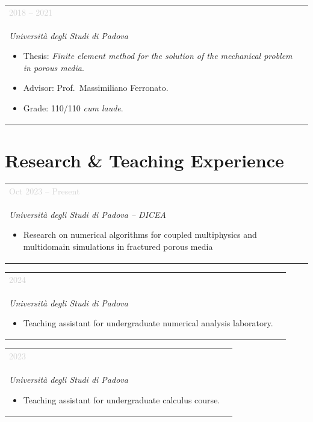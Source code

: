 \documentclass[10pt, a4paper]{article}
\makeatletter
\newcommand{\entry}[4]{%
  \begin{tabular}{@{}p{3.2cm} p{12.0cm}@{}}
    \raggedright\small\textcolor{lightgray}{#1} &
    \begin{minipage}[t]{12.0cm}
      \textbf{#2}\\
      \textit{#3}
      #4
    \end{minipage}
  \end{tabular}%
  \vspace{0.55em}
}
\newenvironment{entrylist}{%
  \begin{itemize}[leftmargin=1em, itemsep=0pt, topsep=2pt, parsep=0pt]
}{%
  \end{itemize}
}
\makeatother
\begin{document}
\entry{2018 – 2021}
  {Bachelor's Degree in Civil Engineering}
  {Università degli Studi di Padova}
  {%
    \begin{entrylist}
      \item Thesis: \textit{Finite element method for the solution of the
        mechanical problem in porous media}.
      \item Advisor: Prof.\ Massimiliano Ferronato.
      \item Grade: 110/110 \textit{cum laude}.
    \end{entrylist}
  }
 
\section{Research \& Teaching Experience}
 
\entry{Oct 2023 – Present}
  {Doctor of Philosophy (PhD)}
  {Università degli Studi di Padova – DICEA}
  {%
    \begin{entrylist}
      \item Research on numerical algorithms for coupled multiphysics and multidomain simulations in fractured porous media
    \end{entrylist}
  }
 
\entry{2024}
  {Integrated Didactic – Numerical Analysis (laboratory)}
  {Università degli Studi di Padova}
  {%
    \begin{entrylist}
      \item Teaching assistant for undergraduate numerical analysis laboratory.
    \end{entrylist}
  }
 
\entry{2023}
  {Integrated Didactic – Calculus (exercises)}
  {Università degli Studi di Padova}
  {%
    \begin{entrylist}
      \item Teaching assistant for undergraduate calculus course.
    \end{entrylist}
  }
 

 
 

 
\end{document}

